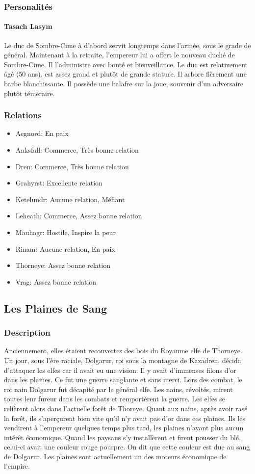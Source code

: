 \subsubsection{Personalités}
\paragraph{Tasach Lasym}
Le duc de Sombre-Cime à d'abord servit longtemps dans l'armée, sous le grade de général.
Maintenant à la retraite, l'empereur lui a offert le nouveau duché de Sombre-Cime.
Il l'administre avec bonté et bienveillance.
Le duc est relativement âgé (50 ans), est assez grand et plutôt de grande stature.
Il arbore fièrement une barbe blanchissante.
Il possède une balafre sur la joue, souvenir d'un adversaire plutôt téméraire.
\subsubsection{Relations}
\begin{itemize}
\item Aegnord: En paix 
\item Anksfall: Commerce, Très bonne relation 
\item Dren: Commerce, Très bonne relation 
\item Grahyrst: Excellente relation  
\item Ketelundr: Aucune relation, Méfiant
\item Leheath: Commerce, Assez bonne relation 
\item Mauhagr: Hostile, Inspire la peur 
\item Rinam: Aucune relation, En paix 
\item Thorneye: Assez bonne relation 
\item Vrag: Assez bonne relation 
\end{itemize} 
\subsection{Les Plaines de Sang}
\subsubsection{Description}
\hypertarget{lesplainesdesang}{}Anciennement, elles étaient recouvertes des bois du Royaume elfe de Thorneye.
Un jour, sous l'ère raciale, Dolgarur, roi sous la montagne de Kazadren, décida d'attaquer les elfes car il avait eu une vision: 
Il y avait d'immenses filons d'or dans les plaines.
Ce fut une guerre sanglante et sans merci.
Lors des combat, le roi nain Dolgarur fut décapité par le général elfe.
Les nains, révoltés, mirent toutes leur fureur dans les combats et remportèrent la guerre.
Les elfes se relièrent alors dans l'actuelle forêt de Thoreye.
Quant aux nains, après avoir rasé la forêt, ils s’aperçurent bien vite qu'il n'y avait pas d'or dans ces plaines. 
Ils les vendirent à l'empereur quelques temps plus tard, les plaines n'ayant plus aucun intérêt économique.
Quand les paysans s'y installèrent et firent pousser du blé, celui-ci avait une couleur rouge pourpre.
On dit que cette couleur est due au sang de Dolgarur.
Les plaines sont actuellement un des moteurs économique de l'empire.
